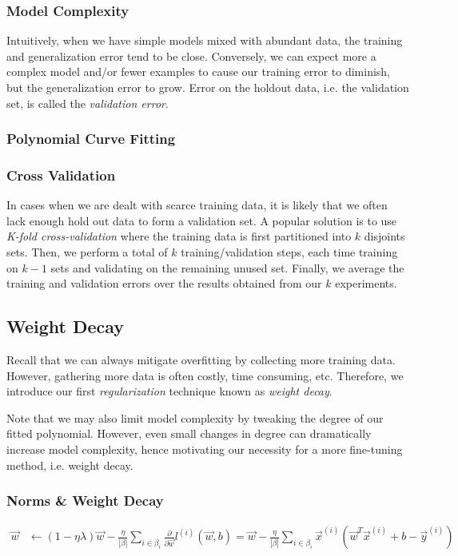 \documentclass[a4paper,12pt]{article}
\theoremstyle{definition}
\begin{document}
    \subsubsection*{Model Complexity}
    Intuitively, when we have simple models mixed with abundant data, the training and generalization error tend to be close.
    Conversely, we can expect more a complex model and/or fewer examples to cause our training error to diminish, but the
    generalization error to grow. Error on the holdout data, i.e. the validation set, is called the \textit{validation error}.
    
    \subsubsection*{Polynomial Curve Fitting}
    \subsubsection*{Cross Validation}
    In cases when we are dealt with scarce training data, it is likely that we often lack enough hold out data to form a validation
    set. A popular solution is to use \textit{K-fold cross-validation} where the training data is first partitioned into $k$ disjoints 
    sets. Then, we perform a total of $k$ training/validation steps, each time training on $k-1$ sets and validating on the remaining unused set.
    Finally, we average the training and validation errors over the results obtained from our $k$ experiments.
    \subsection*{Weight Decay}
    Recall that we can always mitigate overfitting by collecting more training data. However, gathering more data is often costly, time consuming,
    etc. Therefore, we introduce our first \textit{regularization} technique known as \textit{weight decay}.
    
    Note that we may also limit model complexity by tweaking the degree of our fitted polynomial. However, even small
    changes in degree can dramatically increase model complexity, hence motivating our necessity for a more fine-tuning method, i.e. weight decay.

    \subsubsection*{Norms \& Weight Decay}
    \begin{equation*}
        \begin{aligned}
            \vec{w}     &\leftarrow (1-\eta\lambda)\vec{w} - \frac{\eta}{|\beta|}\sum_{i\in\beta_i}\frac{\partial}{\partial\vec{w}}l^{(i)}(\vec{w},b) = \vec{w}- \frac{\eta}{|\beta|}\sum_{i\in\beta_i}\vec{x}^{(i)}(\vec{w}^T\vec{x}^{(i)} + b - \vec{y}^{(i)}) \\
        \end{aligned}
    \end{equation*}
\end{document}
